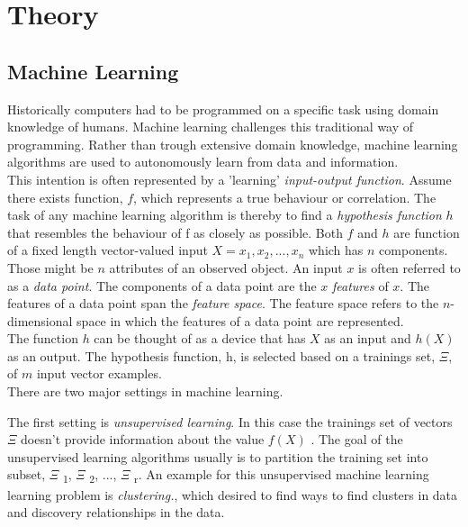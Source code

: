\chapter{Theory}
\section{Machine Learning}

Historically computers had to be programmed on a specific task using domain knowledge of humans. Machine learning challenges this traditional way of programming. Rather than trough extensive domain knowledge, machine learning algorithms are used to autonomously learn from data and information. 
\\

This intention is often represented by a 'learning' \emph{input-output function}. Assume there exists function, $f$, which represents a true behaviour or correlation. The task of any machine learning algorithm is thereby to find a \emph{hypothesis function} $h$ that resembles the behaviour of f as closely as possible. Both $f$ and $h$ are function of a fixed length vector-valued input $X={x_1, x_2, ... , x_n}$ which has $n$ components. Those might be $n$ attributes of an observed object. An input $x$ is often referred to as a \emph{data point}. The components of a data point are the $x$ \emph{features} of $x$. 
The features of a data point span the \emph{feature space}. The feature space refers to the $n$-dimensional space in which the features of a data point are represented.
\\
The function $h$ can be thought of as a device that has $X$ as an input and $h(X)$ as an output. The hypothesis function, h, is selected based on a trainings set, $\Xi$, of $m$ input vector examples.
\\
There are two major settings in machine learning. 

The first setting is \emph{unsupervised learning}. In this case the trainings set of vectors $\Xi$ doesn't provide information about the value $f(X)$ . The goal of the unsupervised learning algorithms usually is to partition the training set into subset, $\Xi$ \textsubscript{1}, $\Xi$ \textsubscript{2}, ..., $\Xi$ \textsubscript{r}. An example for this unsupervised machine learning learning problem is \emph{clustering.}, which desired to find ways to find clusters in data and discovery relationships in the data.

